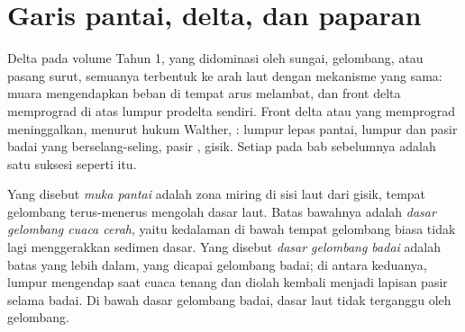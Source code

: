 \begin{omfigure}
\par{}\label{fig:b3:facies-models:rivers}
\end{omfigure}

\section{Garis pantai, delta, dan paparan}\label{sec:b3:facies-models:shelves}

Delta pada volume Tahun 1, yang didominasi oleh sungai, gelombang, atau pasang surut, semuanya
terbentuk ke arah laut dengan mekanisme yang sama: muara mengendapkan beban di tempat
arus melambat, dan front delta memprograd di atas lumpur prodelta sendiri.
Front delta atau  yang memprograd meninggalkan, menurut hukum Walther,
: lumpur lepas pantai, lumpur dan pasir badai yang berselang-seling,
pasir , gisik. Setiap  pada bab sebelumnya adalah satu
suksesi seperti itu.

\begin{definition}\label{def:b3:facies-models:shoreface}
Yang disebut \emph{muka pantai} adalah zona miring di sisi laut dari
gisik, tempat gelombang terus-menerus mengolah dasar laut. Batas bawahnya adalah
\emph{dasar gelombang cuaca cerah}, yaitu kedalaman di bawah
tempat gelombang biasa tidak lagi menggerakkan sedimen dasar. Yang disebut \emph{dasar gelombang
badai} adalah batas yang lebih dalam, yang dicapai gelombang badai;
di antara keduanya, lumpur mengendap saat cuaca tenang dan diolah kembali menjadi lapisan pasir
selama badai. Di bawah dasar gelombang badai, dasar laut tidak terganggu oleh gelombang.
\end{definition}


